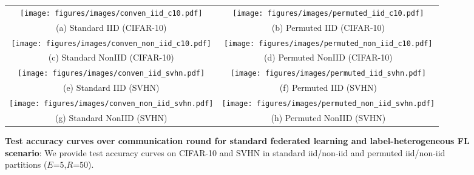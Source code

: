 \begin{figure*}
    \centering
    
    \begin{tabular}{c c }
         
         \texttt{[image: figures/images/conven\_iid\_c10.pdf]} & \texttt{[image: figures/images/permuted\_iid\_c10.pdf]} \\
         (a) Standard IID (CIFAR-10) & (b) Permuted IID (CIFAR-10) \\
         
         \texttt{[image: figures/images/conven\_non\_iid\_c10.pdf]} & \texttt{[image: figures/images/permuted\_non\_iid\_c10.pdf]} \\
         (c) Standard NonIID (CIFAR-10) & (d) Permuted NonIID (CIFAR-10) \\
         
         \texttt{[image: figures/images/conven\_iid\_svhn.pdf]} & \texttt{[image: figures/images/permuted\_iid\_svhn.pdf]} \\
         (e) Standard IID (SVHN) & (f) Permuted IID (SVHN) \\
         
         \texttt{[image: figures/images/conven\_non\_iid\_svhn.pdf]} &  \texttt{[image: figures/images/permuted\_non\_iid\_svhn.pdf]} \\
         (g) Standard NonIID (SVHN) & (h) Permuted NonIID (SVHN) \\
         
    \end{tabular}
    \caption{\textbf{Test accuracy curves over communication round for standard federated learning and label-heterogeneous FL scenario}: We provide test accuracy curves on CIFAR-10 and SVHN in standard iid/non-iid and permuted iid/non-iid partitions ($E$=$5$,$R$=$50$). }
    \label{fig:all}
\end{figure*}